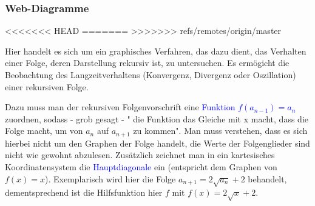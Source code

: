 \subsubsection{Web-Diagramme}

<<<<<<< HEAD
=======
>>>>>>> refs/remotes/origin/master

Hier handelt es sich um ein graphisches Verfahren, das dazu dient, das Verhalten einer Folge, deren Darstellung rekursiv ist, zu untersuchen.  Es ermögicht die Beobachtung des Langzeitverhaltens (Konvergenz, Divergenz oder Oszillation) einer rekursiven Folge. 
\\
\begin{minipage}[c]{0,5\textwidth}
Dazu muss man der rekursiven Folgenvorschrift eine \textcolor{blue}{Funktion $f(a_{n-1})=a_{n}$} zuordnen, sodass - grob gesagt - " die Funktion das Gleiche mit x macht, dass die Folge macht, um von $a_{n}$ auf $a_{n+1}$ zu kommen". Man muss verstehen, dass es sich hierbei nicht um den Graphen der Folge handelt, die Werte der Folgenglieder sind nicht wie gewohnt abzulesen. Zusätzlich zeichnet man in ein kartesisches Koordinatensystem die \textcolor{blue}{Hauptdiagonale} ein (entspricht dem Graphen von $f(x)=x$).  Exemplarisch wird hier die Folge $a_{n+1}=2\sqrt{a_n}+2$ behandelt, dementsprechend ist die Hilfsfunktion hier $f$ mit $f(x)=2\sqrt{x} +2$.\\
\end{minipage}
